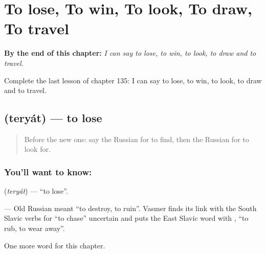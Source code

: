 
\chapter{To lose, To win, To look, To draw, To travel}
\label{ch:ru-to-lose-to-win-to-look-to-draw-to-travel}

\begin{chapteropening}
\textbf{By the end of this chapter:} \emph{I can say to lose, to win, to look, to draw and to travel.}

Complete the last lesson of chapter 135: I can say to lose, to win, to look, to draw and to travel.
\end{chapteropening}

\section[\texorpdfstring{\ru{терять} (teryát)}{терять (teryát)}]{ (teryát) — to lose}

\label{lesson:RU-C135-to-lose}



\begin{quote}
Before the new one: say the Russian for to find, then the Russian for to look for.
\end{quote}

\subsection*{You'll want to know: }
\textbf{} (\emph{teryát}) — \textquotedblleft{}to lose\textquotedblright{}.

\begin{cousinweb}
\textbf{} — Old Russian \emph{} meant \textquotedblleft{}to destroy, to ruin\textquotedblright{}. Vasmer finds its link with the South Slavic verbs for \textquotedblleft{}to chase\textquotedblright{} uncertain and puts the East Slavic word with \emph{}, \textquotedblleft{}to rub, to wear away\textquotedblright{}.
\end{cousinweb}

\begin{grammarlens}[title={What you've built}]
One more word for this chapter.
\end{grammarlens}

